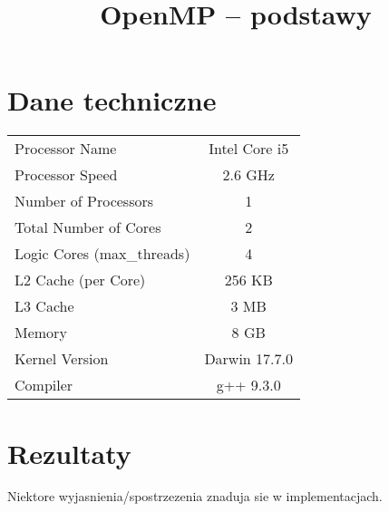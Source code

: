 \documentclass{bmvc2k}
\title{OpenMP -- podstawy}
\begin{document}
\maketitle



\section{Dane techniczne}

\begin{table}[H]
\begin{center}
\begin{tabular}{|l|c|}
\hline
Processor Name & Intel Core i5 \\
Processor Speed &	2.6 GHz \\
Number of Processors &	1 \\
Total Number of Cores &	2 \\
Logic Cores (max\_threads) &	4 \\
L2 Cache (per Core) &	256 KB \\
L3 Cache &	3 MB \\
Memory &	8 GB \\
Kernel Version &	Darwin 17.7.0 \\
Compiler & g++ 9.3.0 \\
\hline
\end{tabular}
\end{center}
\end{table}

\section{Rezultaty}

Niektore wyjasnienia/spostrzezenia znaduja sie w implementacjach.
\end{document}
